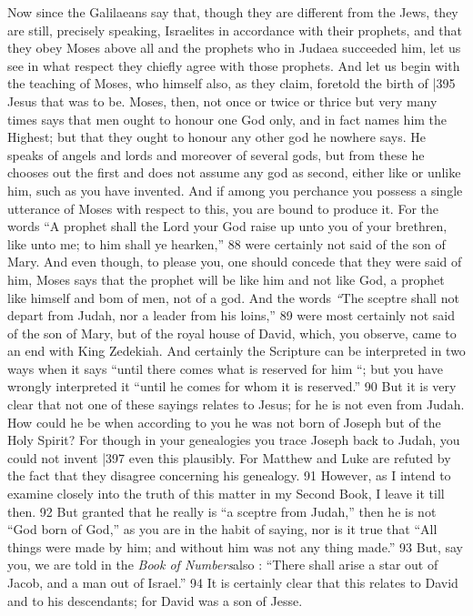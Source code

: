 Now since the Galilaeans say that, though they are different from the Jews, they are still, precisely speaking, Israelites in accordance with their prophets, and that they obey Moses above all and the prophets who in Judaea succeeded him, let us see in what respect they chiefly agree with those prophets. And let us begin with the teaching of Moses, who himself also, as they claim, foretold the birth of
|395 Jesus that was to be. Moses, then, not once or twice or thrice but very many times says that men ought to honour one God only, and in fact names him the Highest; but that they ought to honour any other god he nowhere says. He speaks of angels and lords and moreover of several gods, but from these he chooses out the first and does not assume any god as second, either like or unlike him, such as you have invented. And if among you perchance you possess a single utterance of Moses with respect to this, you are bound to produce it. For the words ``A prophet shall the Lord your God raise up unto you of your brethren, like unto me; to him shall ye hearken,''
88 were certainly not said of the son of Mary. And even though, to please you, one should concede that they were said of him, Moses says that the prophet will be like him and not like God, a prophet like himself and bom of men, not of a god. And the words \emph{``}The sceptre shall not depart from Judah, nor a leader from his loins,''
89 were most certainly not said of the son of Mary, but of the royal house of David, which, you observe, came to an end with King Zedekiah. And certainly the Scripture can be interpreted in two ways when it says ``until there comes what is reserved for him ``; but you have wrongly interpreted it ``until he comes for whom it is reserved.''
90 But it is very clear that not one of these sayings relates to Jesus; for he is not even from Judah. How could he be when according to you he was not born of Joseph but of the Holy Spirit? For though in your genealogies you trace Joseph back to Judah, you could not invent
|397 even this plausibly. For Matthew and Luke are refuted by the fact that they disagree concerning his genealogy. 91 However, as I intend to examine closely into the truth of this matter in my Second Book, I leave it till then. 92 But granted that he really is ``a sceptre from Judah,'' then he is not ``God born of God,'' as you are in the habit of saying, nor is it true that ``All things were made by him; and without him was not any thing made.''
93 But, say you, we are told in the \emph{Book of Numbers}also : ``There shall arise a star out of Jacob, and a man out of Israel.''
94 It is certainly clear that this relates to David and to his descendants; for David was a son of Jesse.

